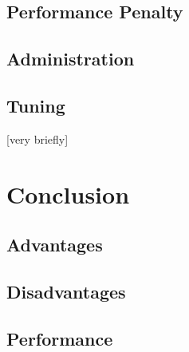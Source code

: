\documentclass[titlepage, a4paper, 11pt]{scrartcl}
\begin{document}
        \subsection{Performance Penalty}



        \subsection{Administration}



        \subsection{Tuning}

        [very briefly]


    \section{Conclusion}

        \subsection{Advantages}


        \subsection{Disadvantages}


        \subsection{Performance}
    
\end{document}
